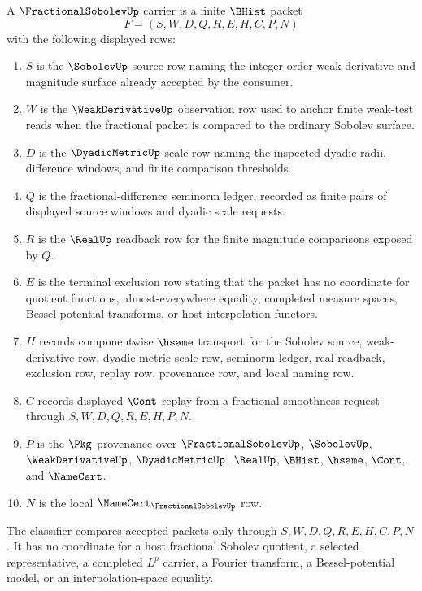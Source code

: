 \begin{definition}
\label{def:fractional-sobolev-carrier}
A $\FractionalSobolevUp$ carrier is a finite $\BHist$ packet
$$
F=(S,W,D,Q,R,E,H,C,P,N)
$$
with the following displayed rows:
\begin{enumerate}
\item $S$ is the $\SobolevUp$ source row naming the integer-order weak-derivative and magnitude surface already accepted by the consumer.
\item $W$ is the $\WeakDerivativeUp$ observation row used to anchor finite weak-test reads when the fractional packet is compared to the ordinary Sobolev surface.
\item $D$ is the $\DyadicMetricUp$ scale row naming the inspected dyadic radii, difference windows, and finite comparison thresholds.
\item $Q$ is the fractional-difference seminorm ledger, recorded as finite pairs of displayed source windows and dyadic scale requests.
\item $R$ is the $\RealUp$ readback row for the finite magnitude comparisons exposed by $Q$.
\item $E$ is the terminal exclusion row stating that the packet has no coordinate for quotient functions, almost-everywhere equality, completed measure spaces, Bessel-potential transforms, or host interpolation functors.
\item $H$ records componentwise $\hsame$ transport for the Sobolev source, weak-derivative row, dyadic metric scale row, seminorm ledger, real readback, exclusion row, replay row, provenance row, and local naming row.
\item $C$ records displayed $\Cont$ replay from a fractional smoothness request through $S,W,D,Q,R,E,H,P,N$.
\item $P$ is the $\Pkg$ provenance over $\FractionalSobolevUp$, $\SobolevUp$, $\WeakDerivativeUp$, $\DyadicMetricUp$, $\RealUp$, $\BHist$, $\hsame$, $\Cont$, and $\NameCert$.
\item $N$ is the local $\NameCert_{\FractionalSobolevUp}$ row.
\end{enumerate}
The classifier compares accepted packets only through $S,W,D,Q,R,E,H,C,P,N$. It has no coordinate for a host fractional Sobolev quotient, a selected representative, a completed $L^p$ carrier, a Fourier transform, a Bessel-potential model, or an interpolation-space equality.
\end{definition}


